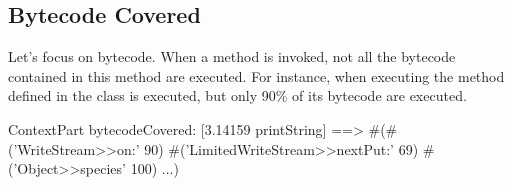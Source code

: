 \subsection*{Bytecode Covered}
Let's focus on bytecode. When a method is invoked, not all the bytecode contained in this method are executed. For instance, when executing   the method  defined in the class  is executed, but only 90\% of its bytecode are executed.
\begin{scode}
ContextPart bytecodeCovered: [3.14159 printString]
==>  #(#('WriteStream>>on:' 90) #('LimitedWriteStream>>nextPut:' 69)
#('Object>>species' 100) ...)
\end{scode}
%
%				
%	
% 



\ifx\wholebook\relax\else\fi
